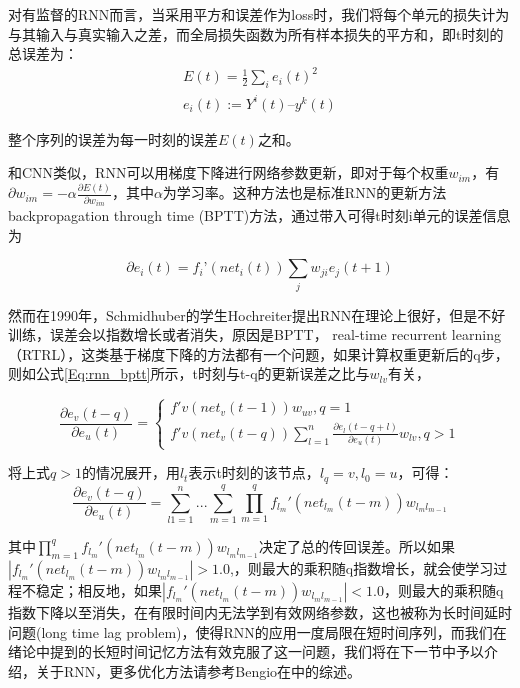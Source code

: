 对有监督的RNN而言，当采用平方和误差作为loss时，我们将每个单元的损失计为与其输入与真实输入之差，而全局损失函数为所有样本损失的平方和，即t时刻的总误差为：
\begin{equation}
 \begin{array}{lr}
E(t) = \frac{1}{2}\sum_i{{e_i(t)}^2}\\
e_i(t) := Y^i(t) –y^k(t)
 \end{array}
\end{equation}

整个序列的误差为每一时刻的误差$E(t)$之和。


和CNN类似，RNN可以用梯度下降进行网络参数更新，即对于每个权重$w_{im}$，有
$\partial w_{im} = -\alpha \frac{\partial E(t)}{\partial w_{im}}$，其中$\alpha$为学习率。这种方法也是标准RNN的更新方法backpropagation through time (BPTT)方法，通过带入可得t时刻i单元的误差信息为

\begin{equation}
\partial e_i(t) = f_i’(net_i(t))\sum_j{w_{ji}e_j(t+1)}
\end{equation}

然而在1990年，Schmidhuber的学生Hochreiter提出RNN在理论上很好，但是不好训练，误差会以指数增长或者消失\cite{williams1995gradient}，原因是BPTT， real-time recurrent learning（RTRL）\cite{williams1989learning}，这类基于梯度下降的方法都有一个问题，如果计算权重更新后的q步，则如公式\ref{Eq:rnn_bptt}所示，t时刻与t-q的更新误差之比与$w_{lv}$有关，

\begin{equation}\label{Eq:rnn_bptt}
	\frac{\partial e_v(t-q)}{\partial e_u(t)} = 
	\left\{
	\begin{array}{lr}
		f'v(net_v(t-1))w_{uv}, q=1\\
		f'v(net_v(t-q))\sum_{l=1}^n{\frac{\partial e_l(t-q+l)}{\partial e_u(t)}w_{lv}}, q>1
	\end{array}
	\right.
\end{equation}

将上式$q>1$的情况展开，用$l_t$表示t时刻的该节点，$l_q = v, l_0 = u$，可得：
\begin{equation}
 \frac{\partial e_v(t-q)}{\partial e_u(t)} = \sum_{l1=1}^n ... \sum_{m=1}^q{\prod_{m=1}^q{f_{l_m}'(net_{l_m}(t-m))w_{l_ml_{m-1}}}}
\end{equation}

其中$\prod_{m=1}^q{f_{l_m}'(net_{l_m}(t-m))w_{l_ml_{m-1}}}$决定了总的传回误差。所以如果$|{f_{l_m}'(net_{l_m}(t-m))w_{l_ml_{m-1}}}|>1.0$,，则最大的乘积随q指数增长，就会使学习过程不稳定；相反地，如果$|{f_{l_m}'(net_{l_m}(t-m))w_{l_ml_{m-1}}}|<1.0$，则最大的乘积随q指数下降以至消失，在有限时间内无法学到有效网络参数，这也被称为长时间延时问题(long time lag problem)，使得RNN的应用一度局限在短时间序列，而我们在绪论中提到的长短时间记忆方法有效克服了这一问题，我们将在下一节中予以介绍，关于RNN，更多优化方法请参考Bengio在\cite{bengio2013advances}中的综述。





